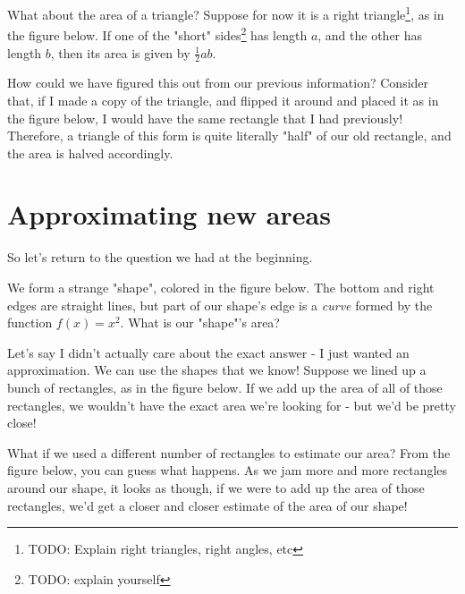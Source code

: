 \documentclass{article}
\begin{document}


What about the area of a triangle? Suppose for now it is a right triangle\footnote{TODO: Explain right triangles, right angles, etc}, as in the figure below. If one of the "short" sides\footnote{TODO: explain yourself} has length $a$, and the other has length $b$, then its area is given by $\frac{1}{2}ab$. 


How could we have figured this out from our previous information? Consider that, if I made a copy of the triangle, and flipped it around and placed it as in the figure below,  I would have the same rectangle that I had previously! Therefore, a triangle of this form is quite literally "half" of our old rectangle, and the area is halved accordingly.



\section{Approximating new areas}

So let's return to the question we had at the beginning.

We form a strange "shape", colored in the figure below. The bottom and right edges are straight lines, but part of our shape's edge is a \textit{curve} formed by the function $f(x) = x^2$. What is our "shape"'s area?



Let's say I didn't actually care about the exact answer - I just wanted an approximation. We can use the shapes that we know! Suppose we lined up a bunch of rectangles, as in the figure below. If we add up the area of all of those rectangles, we wouldn't have the exact area we're looking for - but we'd be pretty close!



What if we used a different number of rectangles to estimate our area? From the figure below, you can guess what happens. As we jam more and more rectangles around our shape, it looks as though, if we were to add up the area of those rectangles, we'd get a closer and closer estimate of the area of our shape!
\end{document}

